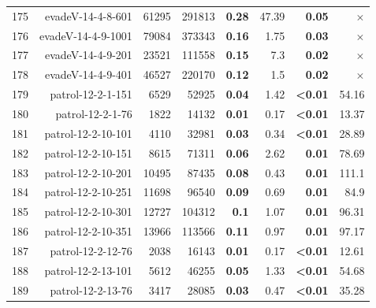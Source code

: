 \begin{longtable}{lrr@{\hskip 12pt}r@{\hskip 12pt}r@{\hskip 12pt}r@{\hskip 12pt}r@{\hskip 12pt}r}
175 & \multirow{1}{*}{evadeV-14-4-8-601} & \multirow{1}{*}{61295} & \multirow{1}{*}{291813} & \textbf{0.28} & 47.39 & \textbf{0.05} & $\times$ \\
176 & \multirow{1}{*}{evadeV-14-4-9-1001} & \multirow{1}{*}{79084} & \multirow{1}{*}{373343} & \textbf{0.16} & 1.75 & \textbf{0.03} & $\times$ \\
177 & \multirow{1}{*}{evadeV-14-4-9-201} & \multirow{1}{*}{23521} & \multirow{1}{*}{111558} & \textbf{0.15} & 7.3 & \textbf{0.02} & $\times$ \\
178 & \multirow{1}{*}{evadeV-14-4-9-401} & \multirow{1}{*}{46527} & \multirow{1}{*}{220170} & \textbf{0.12} & 1.5 & \textbf{0.02} & $\times$ \\
179 & \multirow{1}{*}{patrol-12-2-1-151} & \multirow{1}{*}{6529} & \multirow{1}{*}{52925} & \textbf{0.04} & 1.42 & \textbf{<0.01} & 54.16 \\
180 & \multirow{1}{*}{patrol-12-2-1-76} & \multirow{1}{*}{1822} & \multirow{1}{*}{14132} & \textbf{0.01} & 0.17 & \textbf{<0.01} & 13.37 \\
181 & \multirow{1}{*}{patrol-12-2-10-101} & \multirow{1}{*}{4110} & \multirow{1}{*}{32981} & \textbf{0.03} & 0.34 & \textbf{<0.01} & 28.89 \\
182 & \multirow{1}{*}{patrol-12-2-10-151} & \multirow{1}{*}{8615} & \multirow{1}{*}{71311} & \textbf{0.06} & 2.62 & \textbf{0.01} & 78.69 \\
183 & \multirow{1}{*}{patrol-12-2-10-201} & \multirow{1}{*}{10495} & \multirow{1}{*}{87435} & \textbf{0.08} & 0.43 & \textbf{0.01} & 111.1 \\
184 & \multirow{1}{*}{patrol-12-2-10-251} & \multirow{1}{*}{11698} & \multirow{1}{*}{96540} & \textbf{0.09} & 0.69 & \textbf{0.01} & 84.9 \\
185 & \multirow{1}{*}{patrol-12-2-10-301} & \multirow{1}{*}{12727} & \multirow{1}{*}{104312} & \textbf{0.1} & 1.07 & \textbf{0.01} & 96.31 \\
186 & \multirow{1}{*}{patrol-12-2-10-351} & \multirow{1}{*}{13966} & \multirow{1}{*}{113566} & \textbf{0.11} & 0.97 & \textbf{0.01} & 97.17 \\
187 & \multirow{1}{*}{patrol-12-2-12-76} & \multirow{1}{*}{2038} & \multirow{1}{*}{16143} & \textbf{0.01} & 0.17 & \textbf{<0.01} & 12.61 \\
188 & \multirow{1}{*}{patrol-12-2-13-101} & \multirow{1}{*}{5612} & \multirow{1}{*}{46255} & \textbf{0.05} & 1.33 & \textbf{<0.01} & 54.68 \\
189 & \multirow{1}{*}{patrol-12-2-13-76} & \multirow{1}{*}{3417} & \multirow{1}{*}{28085} & \textbf{0.03} & 0.47 & \textbf{<0.01} & 35.28 \\

\end{longtable}
